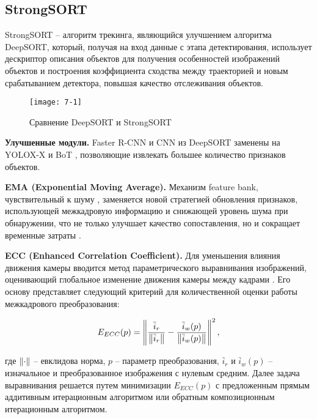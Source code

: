 \subsection{StrongSORT}

StrongSORT -- алгоритм трекинга, являющийся улучшением алгоритма DeepSORT, который, получая на вход данные с этапа детектирования, использует дескриптор описания объектов для получения особенностей изображений объектов и  построения коэффициента сходства между траекторией и новым срабатыванием детектора, повышая качество отслеживания объектов.

\vspace{0.3cm}

\begin{figure}[ht]
    \centering
    \texttt{[image: 7-1]}
    \caption{Сравнение DeepSORT и StrongSORT}
    \label{img:7-1}
\end{figure}

\textbf{Улучшенные модули.} Faster R-CNN и CNN из DeepSORT заменены на YOLOX-X \cite{7-1} и BoT \cite{7-2}, позволяющие извлекать большее количество признаков объектов.

\vspace{0.2cm}

\textbf{EMA (Exponential Moving Average).} Механизм feature bank, чувствительный к шуму \cite{7-3}, заменяется новой стратегией обновления признаков, использующей межкадровую информацию и снижающей уровень шума при обнаружении, что не только улучшает качество сопоставления, но и сокращает временные затраты \cite{7-4}.

\vspace{0.2cm}

\textbf{ECC (Enhanced Correlation Coefficient).} Для уменьшения влияния движения камеры вводится метод параметрического выравнивания изображений, оценивающий глобальное изменение движения камеры между кадрами \cite{7-5}. Его основу представляет следующий критерий для количественной оценки работы межкадрового преобразования:

    \begin{equation}
        E_{ECC}(p) = \left\lVert \frac{\bar{i}_r}{\left\lVert\bar{i}_r\right\rVert} - \frac{\bar{i}_w(p)}{\left\lVert\bar{i}_w(p)\right\rVert} \right\rVert^2,
    \end{equation}

\noindent где $\left\lVert\cdot\right\rVert$ -- евклидова норма, $p$ -- параметр преобразования, $\bar{i}_r$ и $\bar{i}_w(p)$ -- изначальное и преобразованное изображения с нулевым средним. Далее задача выравнивания решается путем минимизации $E_{ECC}(p)$ с предложенным прямым аддитивным итерационным алгоритмом или обратным композиционным итерационным алгоритмом.

